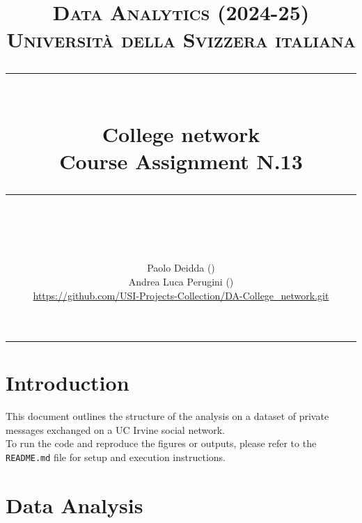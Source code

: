 \documentclass{article}
\title{
	\normalfont\normalsize
	\textsc{Data Analytics (2024-25)\\
	Universit\`a della Svizzera italiana}\\
	\rule{\linewidth}{0.5pt}\\
	{\huge College network\\
	\small Course Assignment N.13}\\
	\rule{\linewidth}{1pt}\\
	\vspace{5pt}
}
\author{
	Paolo Deidda (\text{paolo.deidda@usi.ch}) \\ 
	Andrea Luca Perugini (\text{andrea.perugini@usi.ch})\\
	\url{https://github.com/USI-Projects-Collection/DA-College_network.git}
	}
\begin{document}
\maketitle

\tableofcontents

\vspace{100pt}
\rule{\linewidth}{1pt}

\section*{Introduction}
This document outlines the structure of the analysis on a dataset of private messages exchanged on a UC Irvine social network.\\

To run the code and reproduce the figures or outputs, please refer to the \texttt{README.md} file for setup and execution instructions.
\newpage

\section{Data Analysis}


\newpage

% 



\end{document}
